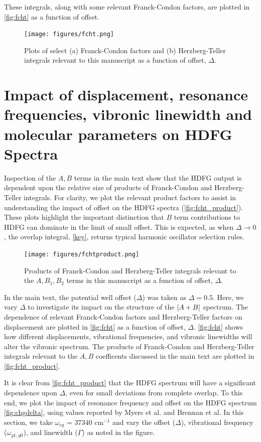 \documentclass[aip, jcp, reprint, onecolumn, nofootinbib]{revtex4-2}
\begin{document}
These integrals, along with some relevant Franck-Condon factors, are plotted in \autoref{fig:fcht} as a function of offset. 

\begin{figure}[!htbp]
	\centering
	\texttt{[image: figures/fcht.png]}
	\caption{Plots of select (a) Franck-Condon factors and (b) Herzberg-Teller integrals relevant to this manuscript as a function of offset, $\Delta$.} 
	\label{fig:fcht}
\end{figure}


\newpage
\section{Impact of displacement, resonance frequencies, vibronic linewidth and molecular parameters on HDFG Spectra}
Inspection of the $A,B$ terms in the main text show that the HDFG output is dependent upon the relative size of products of Franck-Condon and Herzberg-Teller integrals.
For clarity, we plot the relevant product factors to assist in understanding the impact of offset on the HDFG spectra (\autoref{fig:fcht_product}).
These plots highlight the important distinction that $B$ term contributions to HDFG can dominate in the limit of small offset.
This is expected, as when $\Delta \rightarrow 0$, the overlap integral, \autoref{key}, returns typical harmonic oscillator selection rules.

\begin{figure}[!htbp]
	\centering
	\texttt{[image: figures/fchtproduct.png]}
	\caption{Products of Franck-Condon and Herzberg-Teller integrals relevant to the $A, B_1, B_2$ terms in this manuscript as a function of offset, $\Delta$.} 
	\label{fig:fcht_product}
\end{figure}

In the main text, the potential well offset ($\Delta$) was taken as $\Delta = 0.5$.
Here, we vary $\Delta$ to investigate its impact on the structure of the $\abs{A+B}$ spectrum.
The dependence of relevant Franck-Condon factors and Herzberg-Teller factors on displacement are plotted in \autoref{fig:fcht} as a function of offset, $\Delta$.
\autoref{fig:fcht} shows how different displacements, vibrational frequencies, and vibronic linewidths will alter the vibronic spectrum.
The products of Franck-Condon and Herzberg-Teller integrals relevant to the $A,B$ coefficents discussed in the main text are plotted in \autoref{fig:fcht_product}.

\pagebreak

It is clear from \autoref{fig:fcht_product} that the HDFG spectrum will have a significant dependence upon $\Delta$, even for small deviations from complete overlap. 
To this end, we plot the impact of resonance frequency and offset on the HDFG spectrum \autoref{fig:chgdelta}, using values reported by Myers et al. and Brennan et al. \cite{Myers1982, Brennan2024}
In this section, we take $\omega_{eg}$ = $37340$ cm$^{-1}$ and vary the offset ($\Delta$), vibrational frequency ($\omega_{g1,g0}$), and linewidth ($\Gamma$) as noted in the figure.
\end{document}
